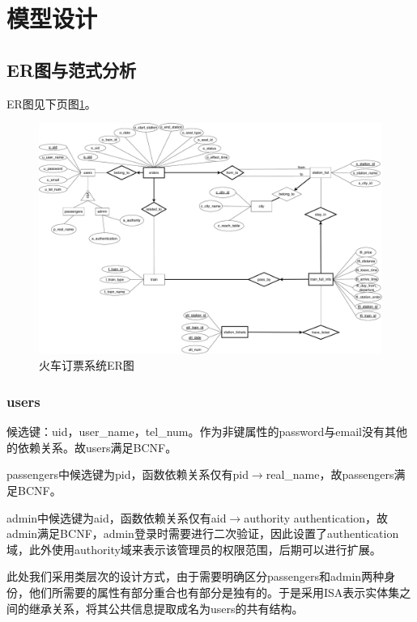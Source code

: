 \documentclass[UTF-8,twoside,c5size,hyperref]{ctexart}
\begin{document}
    \section{模型设计}
    \subsection{\textbf{ER}图与范式分析}
    
    ER图见下页图\ref{fig::ER}。
    
    \begin{figure}[!h]
        \centering
        \includegraphics*[width=\textwidth]{RE_2.pdf}
        \caption{火车订票系统ER图}
        \label{fig::ER}
    \end{figure}
    
    \subsubsection{\textbf{users}}\label{sssec:users}
    
    候选键：uid，user\_name，tel\_num。作为非键属性的password与email没有其他的依赖关系。故users满足BCNF。
    
    passengers中候选键为pid，函数依赖关系仅有pid$\to$real\_name，故passengers满足BCNF。
    
    admin中候选键为aid，函数依赖关系仅有aid$\to$authority authentication，故admin满足BCNF，admin登录时需要进行二次验证，因此设置了authentication域，此外使用authority域来表示该管理员的权限范围，后期可以进行扩展。
    
    此处我们采用类层次的设计方式，由于需要明确区分passengers和admin两种身份，他们所需要的属性有部分重合也有部分是独有的。于是采用ISA表示实体集之间的继承关系，将其公共信息提取成名为users的共有结构。
    
\end{document}
